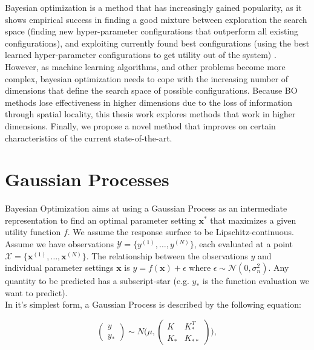 Bayesian optimization is a method that has increasingly gained popularity, as it shows empirical success in finding a good mixture between exploration the search space (finding new hyper-parameter configurations that outperform all existing configurations), and exploiting currently found best configurations (using the best learned hyper-parameter configurations to get utility out of the system) \citep{BOIncreasingPopularityEmpirically}. \\

However, as machine learning algorithms, and other problems become more complex, bayesian optimization needs to cope with the increasing number of dimensions that define the search space of possible configurations.
Because BO methods lose effectiveness in higher dimensions due to the loss of information through spatial locality, this thesis work explores methods that work in higher dimensions.
Finally, we propose a novel method that improves on certain characteristics of the current state-of-the-art.

\section{Gaussian Processes}
Bayesian Optimization aims at using a Gaussian Process as an intermediate representation to find an optimal parameter setting $\mathbf{x^*}$ that maximizes a given utility function $f$.
We assume the response surface to be Lipschitz-continuous. \\

Assume we have observations $ \mathcal{Y} = \{ y^{(1)}, \ldots, y^{(N)} \}$, each evaluated at a point $ \mathcal{X} = \{  \mathbf{x}^{(1)}, \ldots, \mathbf{x}^{(N)} \}$.
The relationship between the observations $y$ and individual parameter settings $\mathbf{x}$ is $y = f \left( \mathbf{x} \right) + \epsilon$ where $\epsilon \sim  \mathcal{N} \left( 0, \sigma^2_n \right)$. Any quantity to be predicted has a subscript-star (e.g. $y_*$ is the function evaluation we want to predict).\\

In it's simplest form, a Gaussian Process is described by the following equation:

\begin{equation}
\begin{pmatrix} y \\
y_* \end{pmatrix} \sim N\Biggl(\mu,\begin{pmatrix} K & K^T_*\\
 K_* & K_{**} \end{pmatrix}\Biggr),
\end{equation}

